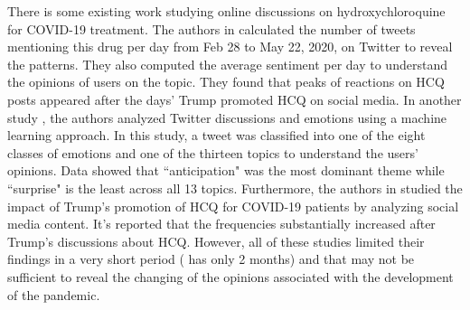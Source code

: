 \documentclass[conference]{IEEEtran}
\begin{document}
	\par
	There is some existing work studying online discussions on hydroxychloroquine for COVID-19 treatment. The authors in \cite{b2} calculated the number of tweets mentioning this drug per day from Feb 28 to May 22, 2020, on Twitter to reveal the patterns. They also computed the average sentiment per day to understand the opinions of users on the topic. They found that peaks of reactions on HCQ posts appeared after the days' Trump promoted HCQ on social media. 
	In another study \cite{b6}, the authors analyzed Twitter discussions and emotions using a machine learning approach. In this study, a tweet was classified into one of the eight classes of emotions and one of the thirteen topics to understand the users' opinions. Data showed that ``anticipation" was the most dominant theme while ``surprise" is the least across all 13 topics. Furthermore, the authors in \cite{b7} studied the impact of Trump's promotion of HCQ for COVID-19 patients by analyzing social media content.
	It's reported that the frequencies substantially increased after Trump's discussions about HCQ. However, all of these studies limited their findings in a very short period (\cite{b7} has only 2 months) and that may not be sufficient to reveal the changing of the opinions associated with the development of the pandemic.
	
\end{document}

